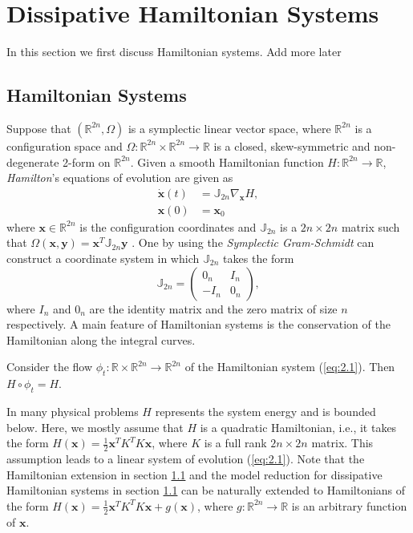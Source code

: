 \section{Dissipative Hamiltonian Systems} \label{sec:2}
In this section we first discuss Hamiltonian systems. Add more later

\subsection{Hamiltonian Systems} Suppose that $(\mathbb{R}^{2n},\Omega)$ is a symplectic linear vector space, where $\mathbb{R}^{2n}$ is a configuration space and $\Omega:\mathbb{R}^{2n}\times \mathbb{R}^{2n} \to \mathbb R$ is a closed, skew-symmetric and non-degenerate 2-form on $\mathbb{R}^{2n}$. Given a smooth Hamiltonian function $H:\mathbb{R}^{2n}\to \mathbb R$, \emph{Hamilton}'s equations of evolution are given as
\begin{equation} \label{eq:2.1}
	\begin{aligned}
	\dot {\mathbf x}(t) &= \mathbb J_{2n} \nabla_{\mathbf x} H, \\
	\mathbf x(0) &= \mathbf x_0
	\end{aligned}
\end{equation}
where $\mathbf x\in\mathbb R^{2n}$ is the configuration coordinates and $\mathbb J_{2n}$ is a $2n\times 2n$ matrix such that $\Omega(\mathbf x,\mathbf y) = \mathbf x^T \mathbb J_{2n} \mathbf y$ \cite{Marsden:2010:IMS:1965128}. One by using the \emph{Symplectic Gram-Schmidt} \cite{de2006symplectic} can construct a coordinate system in which $\mathbb J_{2n}$ takes the form
\begin{equation} \label{eq:2.2}
	\mathbb{J}_{2n} = 
	\begin{pmatrix}
		0_n & I_n \\
		-I_n & 0_n
	\end{pmatrix},
\end{equation}
where $I_n$ and $0_n$ are the identity matrix and the zero matrix of size $n$ respectively. A main feature of Hamiltonian systems is the conservation of the Hamiltonian along the integral curves.
\begin{theorem} \label{theorem:2.1}
\cite{Marsden:2010:IMS:1965128} Consider the flow $\phi_t:\mathbb R\times \mathbb R^{2n} \to \mathbb R^{2n}$ of the Hamiltonian system (\ref{eq:2.1}). Then $H\circ \phi_t = H$.
\end{theorem}

In many physical problems $H$ represents the system energy and is bounded below. Here, we mostly assume that $H$ is a quadratic Hamiltonian, i.e., it takes the form $H(\mathbf x) = \frac 1 2 \mathbf x^T K^T K \mathbf x$, where $K$ is a full rank $2n\times 2n$ matrix. This assumption leads to a linear system of evolution (\ref{eq:2.1}). Note that the Hamiltonian extension in section \ref{} and the model reduction for dissipative Hamiltonian systems in section \ref{} can be naturally extended to Hamiltonians of the form $H(\mathbf x) = \frac 1 2 \mathbf x^T K^T K \mathbf x + g(\mathbf x)$, where $g:\mathbb R^{2n} \to \mathbb R$ is an arbitrary function of $\mathbf x$. 

